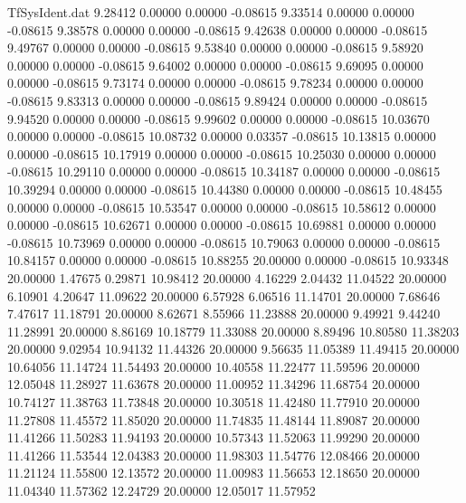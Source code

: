 \begin{filecontents}{TfSysIdent.dat}
   9.28412    0.00000    0.00000   -0.08615
   9.33514    0.00000    0.00000   -0.08615
   9.38578    0.00000    0.00000   -0.08615
   9.42638    0.00000    0.00000   -0.08615
   9.49767    0.00000    0.00000   -0.08615
   9.53840    0.00000    0.00000   -0.08615
   9.58920    0.00000    0.00000   -0.08615
   9.64002    0.00000    0.00000   -0.08615
   9.69095    0.00000    0.00000   -0.08615
   9.73174    0.00000    0.00000   -0.08615
   9.78234    0.00000    0.00000   -0.08615
   9.83313    0.00000    0.00000   -0.08615
   9.89424    0.00000    0.00000   -0.08615
   9.94520    0.00000    0.00000   -0.08615
   9.99602    0.00000    0.00000   -0.08615
  10.03670    0.00000    0.00000   -0.08615
  10.08732    0.00000    0.03357   -0.08615
  10.13815    0.00000    0.00000   -0.08615
  10.17919    0.00000    0.00000   -0.08615
  10.25030    0.00000    0.00000   -0.08615
  10.29110    0.00000    0.00000   -0.08615
  10.34187    0.00000    0.00000   -0.08615
  10.39294    0.00000    0.00000   -0.08615
  10.44380    0.00000    0.00000   -0.08615
  10.48455    0.00000    0.00000   -0.08615
  10.53547    0.00000    0.00000   -0.08615
  10.58612    0.00000    0.00000   -0.08615
  10.62671    0.00000    0.00000   -0.08615
  10.69881    0.00000    0.00000   -0.08615
  10.73969    0.00000    0.00000   -0.08615
  10.79063    0.00000    0.00000   -0.08615
  10.84157    0.00000    0.00000   -0.08615
  10.88255   20.00000    0.00000   -0.08615
  10.93348   20.00000    1.47675    0.29871
  10.98412   20.00000    4.16229    2.04432
  11.04522   20.00000    6.10901    4.20647
  11.09622   20.00000    6.57928    6.06516
  11.14701   20.00000    7.68646    7.47617
  11.18791   20.00000    8.62671    8.55966
  11.23888   20.00000    9.49921    9.44240
  11.28991   20.00000    8.86169   10.18779
  11.33088   20.00000    8.89496   10.80580
  11.38203   20.00000    9.02954   10.94132
  11.44326   20.00000    9.56635   11.05389
  11.49415   20.00000   10.64056   11.14724
  11.54493   20.00000   10.40558   11.22477
  11.59596   20.00000   12.05048   11.28927
  11.63678   20.00000   11.00952   11.34296
  11.68754   20.00000   10.74127   11.38763
  11.73848   20.00000   10.30518   11.42480
  11.77910   20.00000   11.27808   11.45572
  11.85020   20.00000   11.74835   11.48144
  11.89087   20.00000   11.41266   11.50283
  11.94193   20.00000   10.57343   11.52063
  11.99290   20.00000   11.41266   11.53544
  12.04383   20.00000   11.98303   11.54776
  12.08466   20.00000   11.21124   11.55800
  12.13572   20.00000   11.00983   11.56653
  12.18650   20.00000   11.04340   11.57362
  12.24729   20.00000   12.05017   11.57952

\end{filecontents}
